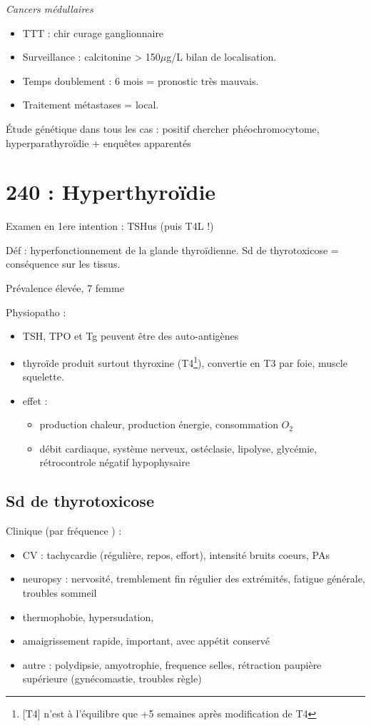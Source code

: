 \documentclass[11pt]{article}
\begin{document}
\emph{Cancers médullaires}
\begin{itemize}
\item TTT : chir \textpm{} curage ganglionnaire
\item Surveillance : calcitonine > 150\(\mu\)g/L \thus bilan de localisation.
\item Temps doublement : 6 mois = pronostic très mauvais.
\item Traitement métastases = local.
\end{itemize}

Étude génétique dans tous les cas : positif \thus chercher phéochromocytome,
hyperparathyroïdie + enquêtes apparentés
\section{240 : Hyperthyroïdie}
\label{sec:org23fff94}
\begin{tcolorbox}
Examen en 1ere intention : TSHus (puis T4L !)
\end{tcolorbox}

Déf : hyperfonctionnement de la glande thyroïdienne. Sd de thyrotoxicose =
conséquence sur les tissus.

Prévalence élevée, 7\texttimes{} femme

Physiopatho :
\begin{itemize}
\item TSH, \gls{TPO} et Tg peuvent être des auto-antigènes
\item thyroïde produit surtout thyroxine (T4\footnote{[T4] n'est à l'équilibre que +5 semaines après modification de T4}), convertie en T3 par foie, muscle
squelette.
\item effet : 
\begin{itemize}
\item \inc production chaleur, \inc production énergie, \inc consommation \(O_2\)
\item \inc débit cardiaque, système nerveux, \inc ostéclasie, \inc lipolyse, \inc
glycémie, rétrocontrole négatif hypophysaire
\end{itemize}
\end{itemize}

\subsection{Sd de thyrotoxicose}
\label{sec:org5181c66}
Clinique (par fréquence \dec) :
\begin{itemize}
\item CV : tachycardie (régulière, repos, \inc effort), \inc intensité bruits
coeurs, \inc PAs
\item neuropsy : nervosité, tremblement fin régulier des extrémités, fatigue
générale, troubles sommeil
\item thermophobie, hypersudation,
\item amaigrissement rapide, important, avec appétit conservé
\item autre : polydipsie, amyotrophie, \inc frequence selles, rétraction paupière
supérieure (gynécomastie, troubles règle)
\end{itemize}
\end{document}
